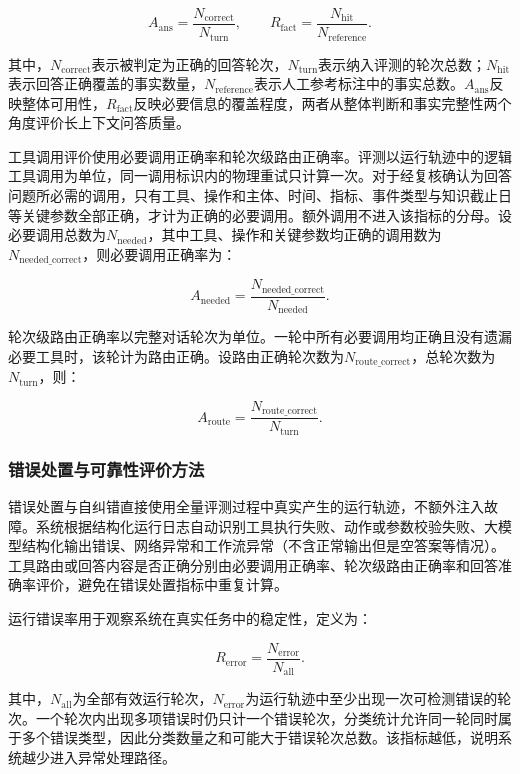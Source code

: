 \[
A_{\mathrm{ans}}=\frac{N_{\mathrm{correct}}}{N_{\mathrm{turn}}},
\qquad
R_{\mathrm{fact}}=\frac{N_{\mathrm{hit}}}{N_{\mathrm{reference}}}.
\]

其中，$N_{\mathrm{correct}}$表示被判定为正确的回答轮次，$N_{\mathrm{turn}}$表示纳入评测的轮次总数；$N_{\mathrm{hit}}$表示回答正确覆盖的事实数量，$N_{\mathrm{reference}}$表示人工参考标注中的事实总数。$A_{\mathrm{ans}}$反映整体可用性，$R_{\mathrm{fact}}$反映必要信息的覆盖程度，两者从整体判断和事实完整性两个角度评价长上下文问答质量。

工具调用评价使用必要调用正确率和轮次级路由正确率。评测以运行轨迹中的逻辑工具调用为单位，同一调用标识内的物理重试只计算一次。对于经复核确认为回答问题所必需的调用，只有工具、操作和主体、时间、指标、事件类型与知识截止日等关键参数全部正确，才计为正确的必要调用。额外调用不进入该指标的分母。设必要调用总数为$N_{\mathrm{needed}}$，其中工具、操作和关键参数均正确的调用数为$N_{\mathrm{needed\_correct}}$，则必要调用正确率为：

\[
A_{\mathrm{needed}}=\frac{N_{\mathrm{needed\_correct}}}{N_{\mathrm{needed}}}.
\]

轮次级路由正确率以完整对话轮次为单位。一轮中所有必要调用均正确且没有遗漏必要工具时，该轮计为路由正确。设路由正确轮次数为$N_{\mathrm{route\_correct}}$，总轮次数为$N_{\mathrm{turn}}$，则：

\[
A_{\mathrm{route}}=\frac{N_{\mathrm{route\_correct}}}{N_{\mathrm{turn}}}.
\]

\subsubsection{错误处置与可靠性评价方法}

错误处置与自纠错直接使用全量评测过程中真实产生的运行轨迹，不额外注入故障。系统根据结构化运行日志自动识别工具执行失败、动作或参数校验失败、大模型结构化输出错误、网络异常和工作流异常（不含正常输出但是空答案等情况）。工具路由或回答内容是否正确分别由必要调用正确率、轮次级路由正确率和回答准确率评价，避免在错误处置指标中重复计算。

运行错误率用于观察系统在真实任务中的稳定性，定义为：

\[
R_{\mathrm{error}}=\frac{N_{\mathrm{error}}}{N_{\mathrm{all}}}.
\]

其中，$N_{\mathrm{all}}$为全部有效运行轮次，$N_{\mathrm{error}}$为运行轨迹中至少出现一次可检测错误的轮次。一个轮次内出现多项错误时仍只计一个错误轮次，分类统计允许同一轮同时属于多个错误类型，因此分类数量之和可能大于错误轮次总数。该指标越低，说明系统越少进入异常处理路径。


